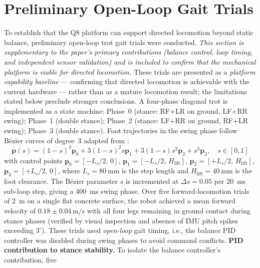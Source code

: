 \documentclass[journal]{IEEEtran}
\newcommand{\vect}[1]{\boldsymbol{#1}}
\newcommand{\dg}{^{\circ}}
\begin{document}
\section{Preliminary Open-Loop Gait Trials}
\label{sec:gait}
To establish that the Q8 platform can support directed
locomotion beyond static balance, preliminary open-loop trot
gait trials were conducted.
\emph{This section is supplementary to the paper's primary
contributions (balance control, loop timing, and independent sensor
validation) and is included to confirm that the mechanical platform
is viable for directed locomotion.}
These trials are presented as a \emph{platform capability
baseline} --- confirming that directed locomotion is achievable
with the current hardware --- rather than as a mature locomotion
result; the limitations stated below preclude stronger conclusions.
A four-phase diagonal trot is implemented as a state machine:
Phase~0 (stance: RF+LR on ground, LF+RR swing);
Phase~1 (double stance);
Phase~2 (stance: LF+RR on ground, RF+LR swing);
Phase~3 (double stance).
Foot trajectories in the swing phase follow Bézier curves of
degree~3 adapted from \cite{rahman2023irondogmini}:
\begin{equation}
\vect{p}(s) = (1-s)^3\vect{p}_0 + 3(1-s)^2 s\vect{p}_1
            + 3(1-s)s^2\vect{p}_2 + s^3\vect{p}_3,
\quad s\in[0,1]
\label{eq:bezier}
\end{equation}
with control points $\vect{p}_0 = [-L_s/2,\,0]$,
$\vect{p}_1 = [-L_s/2,\,H_\text{lift}]$,
$\vect{p}_2 = [+L_s/2,\,H_\text{lift}]$,
$\vect{p}_3 = [+L_s/2,\,0]$, where $L_s=\SI{80}{\milli\metre}$
is the step length and $H_\text{lift}=\SI{40}{\milli\metre}$
is the foot clearance.
The Bézier parameter $s$ is incremented at $\Delta s = 0.05$
per \SI{20}{\milli\second} sub-loop step, giving a
\SI{400}{\milli\second} swing phase.
Over five forward-locomotion trials of \SI{2}{\metre} on a
single flat concrete surface, the robot achieved a mean
forward velocity of $0.18 \pm 0.04\,\text{m/s}$ with all four
legs remaining in ground contact during stance phases (verified
by visual inspection and absence of IMU pitch spikes exceeding
$3\dg$).
These trials used \textit{open-loop} gait timing, i.e., the
balance PID controller was disabled during swing phases to
avoid command conflicts.
\noindent\textbf{PID contribution to stance stability.}
To isolate the balance controller's contribution, five
\end{document}
